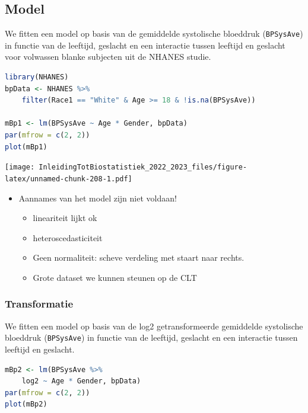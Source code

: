 \documentclass[
  12pt,dutch,coursenotes]{book}
\newcommand{\passthrough}[1]{#1}
\providecommand{\tightlist}{%
  \setlength{\itemsep}{0pt}\setlength{\parskip}{0pt}}
\begin{document}
\hypertarget{model-3}{%
\subsection{Model}\label{model-3}}

We fitten een model op basis van de gemiddelde systolische bloeddruk (\passthrough{\lstinline!BPSysAve!}) in functie van de leeftijd, geslacht en een interactie tussen leeftijd en geslacht voor volwassen blanke subjecten uit de NHANES studie.

\begin{lstlisting}[language=R]
library(NHANES)
bpData <- NHANES %>%
    filter(Race1 == "White" & Age >= 18 & !is.na(BPSysAve))

mBp1 <- lm(BPSysAve ~ Age * Gender, bpData)
par(mfrow = c(2, 2))
plot(mBp1)
\end{lstlisting}

\texttt{[image: InleidingTotBiostatistiek\_2022\_2023\_files/figure-latex/unnamed-chunk-208-1.pdf]}

\begin{itemize}
\item
  Aannames van het model zijn niet voldaan!

  \begin{itemize}
  \tightlist
  \item
    lineariteit lijkt ok
  \item
    heteroscedasticiteit
  \item
    Geen normaliteit: scheve verdeling met staart naar rechts.
  \item
    Grote dataset we kunnen steunen op de CLT
  \end{itemize}
\end{itemize}

\hypertarget{transformatie}{%
\subsubsection{Transformatie}\label{transformatie}}

We fitten een model op basis van de log2 getransformeerde gemiddelde systolische bloeddruk (\passthrough{\lstinline!BPSysAve!}) in functie van de leeftijd, geslacht en een interactie tussen leeftijd en geslacht.

\begin{lstlisting}[language=R]
mBp2 <- lm(BPSysAve %>%
    log2 ~ Age * Gender, bpData)
par(mfrow = c(2, 2))
plot(mBp2)
\end{lstlisting}
\end{document}
